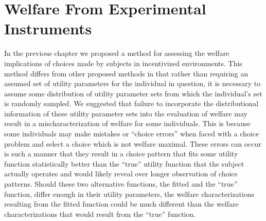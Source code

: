\documentclass[../main.tex]{subfiles}
\begin{document}
\onehalfspacing
\setcounter{chapter}{3}

\chapter{Welfare From Experimental Instruments}

\lltoc %

In the previous chapter we proposed a method for assessing the welfare implications of choices made by subjects in incentivized environments.
This method differs from other proposed methods in that rather than requiring an assumed set of utility parameters for the individual in question, it is necessary to assume some distribution of utility parameter sets from which the individual's set is randomly sampled.
We suggested that failure to incorporate the distributional information of these utility parameter sets into the evaluation of welfare may result in a mischaracterization of welfare for some individuals.
This is because some individuals may make mistakes or \enquote{choice errors} when faced with a choice problem and select a choice which is not welfare maximal.
These errors can occur is such a manner that they result in a choice pattern that fits some utility function statistically better than the \enquote{true} utility function that the subject actually operates and would likely reveal over longer observation of choice patterns.
Should these two alternative functions, the fitted and the \enquote{true} function, differ enough in their utility parameters, the welfare characterizations resulting from the fitted function could be much different than the welfare characterizations that would result from the \enquote{true} function.{\footnotemark}

\addtocounter{footnote}{-1}
\end{document}
